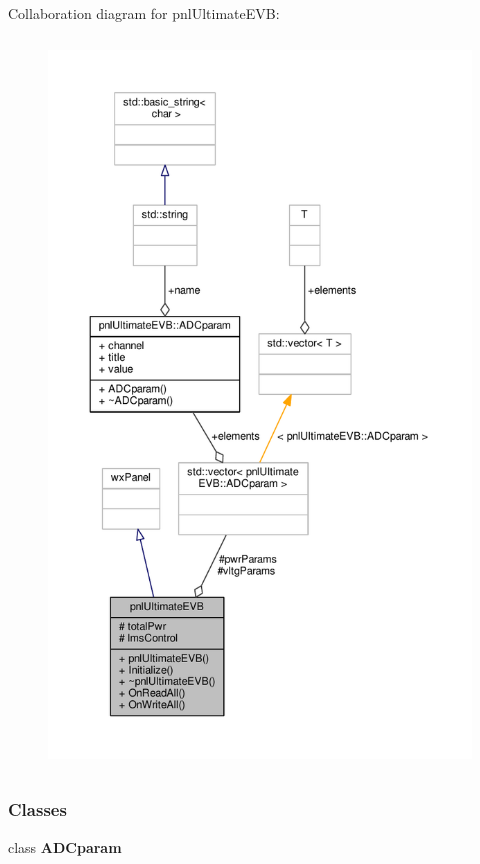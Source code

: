 Collaboration diagram for pnl\+Ultimate\+E\+VB\+:
\nopagebreak
\begin{figure}[H]
\begin{center}
\leavevmode
\includegraphics[height=550pt]{db/de2/classpnlUltimateEVB__coll__graph}
\end{center}
\end{figure}
\subsubsection*{Classes}
\begin{DoxyCompactItemize}
\item 
class {\bf A\+D\+Cparam}
\end{DoxyCompactItemize}
